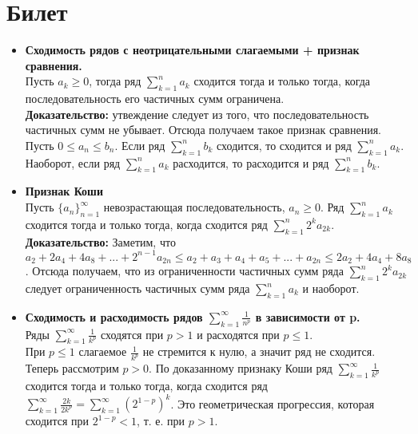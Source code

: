 \documentclass[12pt,a4paper]{article}
\begin{document}
\section{Билет}
\begin{itemize}
  \item \textbf{Сходимость рядов с неотрицательными слагаемыми + признак сравнения.}\\ 
  Пусть $a_k \geq 0$, тогда ряд $\sum_{k = 1}^n a_k$ сходится тогда и только тогда, когда последовательность его частичных сумм ограничена.\\
  \textbf{Доказательство: }утвеждение следует из того, что последовательность частичных сумм не убывает. Отсюда получаем такое признак сравнения.\\
  Пусть $0 \leq a_n \leq b_n$. Если ряд $\sum_{k = 1}^n b_k$ сходится, то сходится и ряд $\sum_{k = 1}^n a_k$.\\
  Наоборот, если ряд $\sum_{k = 1}^n a_k$ расходится, то расходится и ряд $\sum_{k = 1}^n b_k$.\\
  \item \textbf{Признак Коши}\\
  Пусть $\{a_n\}_{n = 1}^{\infty}$ невозрастающая последовательность, $a_n \geq 0$. Ряд $\sum_{k = 1}^n a_k$ сходится тогда и только тогда, когда сходится ряд $\sum_{k = 1}^n 2^k a_{2k}$.\\
  \textbf{Доказательство:} Заметим, что $a_2 + 2a_4 + 4a_8 + ... + 2^{n - 1} a_{2n} \leq a_2 + a_3 + a_4 + a_5 + ... + a_{2n} \leq 2a_2 + 4a_4 + 8a_8$. Отсюда получаем, что из ограниченности частичных сумм ряда $\sum_{k = 1}^n 2^k a_{2k}$ следует ограниченность частичных сумм ряда $\sum_{k = 1}^n a_k$ и наоборот.\\
\item \textbf{Сходимость и расходимость рядов $\sum_{k = 1}^{\infty} \frac{1}{n^p}$ в зависимости от p.}\\
Ряды $\sum_{k = 1}^{\infty} \frac{1}{k^p}$ сходятся при $p > 1$ и расходятся при $p \leq 1$.\\
При $p \leq 1$ слагаемое $\frac{1}{k^p}$ не стремится к нулю, а значит ряд не сходится.\\
Теперь рассмотрим $p > 0$. По доказанному признаку Коши ряд $\sum_{k = 1}^{\infty} \frac{1}{k^p}$ сходится тогда и только тогда, когда сходится ряд $\sum_{k = 1}^{\infty} \frac{2k}{2k^p} = \sum_{k = 1}^{\infty} (2^{1 - p})^k$. Это геометрическая прогрессия, которая сходится при $2^{1 - p} < 1$, т. е. при $p > 1$.
\end{itemize}
\end{document}
